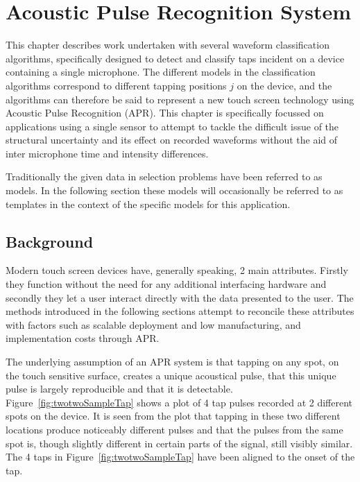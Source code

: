 \chapter{Acoustic Pulse Recognition System}\label{ch:APR}

\ifpdf
    \graphicspath{{Chapter3_APR/Chapter3Figs/PNG/}{Chapter3_APR/Chapter3Figs/PDF/}{Chapter3_APR/Chapter3Figs/}{Chapter3_APR/Chapter3Figs/PDF/}{Chapter3_APR/Chapter3Figs/Kamplitude/}}
\else
    \graphicspath{{Chapter3_APR/Chapter3Figs/EPS/}{Chapter3_APR/Chapter3Figs/}}
\fi

This chapter describes work undertaken with several waveform classification algorithms, specifically designed to detect and classify taps incident on a device containing a single microphone. The different models in the classification algorithms correspond to different tapping positions $j$ on the device, and the algorithms can therefore be said to represent a new touch screen technology using Acoustic Pulse Recognition (APR). This chapter is specifically focussed on applications using a single sensor to attempt to tackle the difficult issue of the structural uncertainty and its effect on recorded waveforms without the aid of inter microphone time and intensity differences.

Traditionally the given data in selection problems have been referred to as models. In the following section these models will occasionally be referred to as templates in the context of the specific models for this application.

\section{Background}
Modern touch screen devices have, generally speaking, 2 main attributes. Firstly they function without the need for any additional interfacing hardware and secondly they let a user interact directly with the data presented to the user. The methods introduced in the following sections attempt to reconcile these attributes with factors such as scalable deployment and low manufacturing, and implementation costs through APR.

The underlying assumption of an APR system is that tapping on any spot, on the touch sensitive surface, creates a unique acoustical pulse, that this unique pulse is largely reproducible and that it is detectable. Figure~\ref{fig:twotwoSampleTap} shows a plot of 4 tap pulses recorded at 2 different spots on the device. It is seen from the plot that tapping in these two different locations produce noticeably different pulses and that the pulses from the same spot is, though slightly different in certain parts of the signal, still visibly similar. The 4 taps in Figure~\ref{fig:twotwoSampleTap} have been aligned to the onset of the tap.

